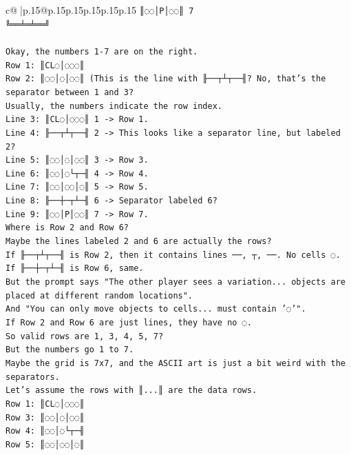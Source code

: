 \documentclass{article}
\begin{document}
{\begin{supertabular}{c@{$\;$}|p{.15\linewidth}@{}p{.15\linewidth}p{.15\linewidth}p{.15\linewidth}p{.15\linewidth}p{.15\linewidth}}
{{{\texttt{║◌◌│P│◌◌║ 7} \\
\texttt{╚══╧═╧══╝} \\
\\ 
\texttt{Okay, the numbers 1{-}7 are on the right.} \\
\texttt{Row 1: ║CL◌│◌◌◌║} \\
\texttt{Row 2: ║◌◌│◌│◌◌║ (This is the line with ╟──┬┴┬──╢? No, that's the separator between 1 and 3?} \\
\texttt{Usually, the numbers indicate the row index.} \\
\texttt{Line 3: ║CL◌│◌◌◌║ 1 {-}> Row 1.} \\
\texttt{Line 4: ╟──┬┴┬──╢ 2 {-}> This looks like a separator line, but labeled 2?} \\
\texttt{Line 5: ║◌◌│◌│◌◌║ 3 {-}> Row 3.} \\
\texttt{Line 6: ║◌◌│◌└┬─╢ 4 {-}> Row 4.} \\
\texttt{Line 7: ║◌◌│◌◌│◌║ 5 {-}> Row 5.} \\
\texttt{Line 8: ╟──┼─┬┴─╢ 6 {-}> Separator labeled 6?} \\
\texttt{Line 9: ║◌◌│P│◌◌║ 7 {-}> Row 7.} \\
\texttt{Where is Row 2 and Row 6?} \\
\texttt{Maybe the lines labeled 2 and 6 are actually the rows?} \\
\texttt{If ╟──┬┴┬──╢ is Row 2, then it contains lines ──, ┬, ──. No cells ◌.} \\
\texttt{If ╟──┼─┬┴─╢ is Row 6, same.} \\
\texttt{But the prompt says "The other player sees a variation... objects are placed at different random locations".} \\
\texttt{And "You can only move objects to cells... must contain '◌'".} \\
\texttt{If Row 2 and Row 6 are just lines, they have no ◌.} \\
\texttt{So valid rows are 1, 3, 4, 5, 7?} \\
\texttt{But the numbers go 1 to 7.} \\
\texttt{Maybe the grid is 7x7, and the ASCII art is just a bit weird with the separators.} \\
\texttt{Let's assume the rows with ║...║ are the data rows.} \\
\texttt{Row 1: ║CL◌│◌◌◌║} \\
\texttt{Row 3: ║◌◌│◌│◌◌║} \\
\texttt{Row 4: ║◌◌│◌└┬─╢} \\
\texttt{Row 5: ║◌◌│◌◌│◌║} \\
}}}
\end{supertabular}}
\end{document}
